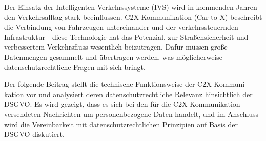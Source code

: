 

Der Einsatz der Intelligenten Verkehrssysteme (IVS) wird in kommenden Jahren den Verkehrsalltag stark beeinflussen. C2X-Kommunikation (Car to X) beschreibt die Verbindung von Fahrzeugen untereinander und der verkehrssteuernden Infrastruktur - diese Technologie hat das Potenzial, zur Straßensicherheit und verbessertem Verkehrsfluss wesentlich beizutragen. Dafür müssen große Datenmengen gesammelt und übertragen werden, was möglicherweise datenschutzrechtliche Fragen mit sich bringt.

Der folgende Beitrag stellt die technische Funktionsweise der C2X-Kommuni-kation vor und analysiert deren datenschutzrechtliche Relevanz hinsichtlich der DSGVO. Es wird gezeigt, dass es sich bei den für die C2X-Kommunikation versendeten Nachrichten um personenbezogene Daten handelt, und im Anschluss wird die Vereinbarkeit mit datenschutzrechtlichen Prinzipien auf Basis der DSGVO diskutiert.